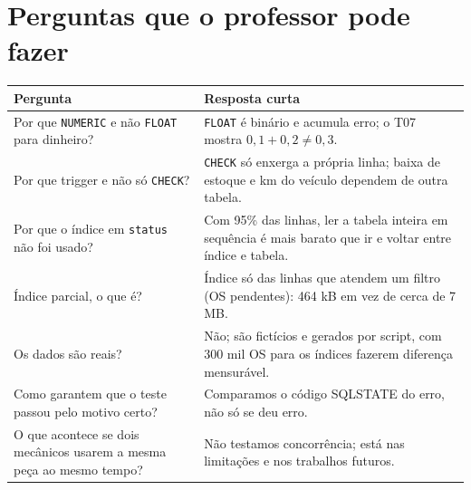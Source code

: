 \documentclass[a4paper,11pt]{article}
\newcommand{\cod}[1]{\texttt{\small #1}}
\begin{document}
\section{Perguntas que o professor pode fazer}
\begin{longtable}{p{6cm}p{9cm}}
\hline
\textbf{Pergunta} & \textbf{Resposta curta} \\ \hline
Por que \cod{NUMERIC} e não \cod{FLOAT} para dinheiro? & \cod{FLOAT} é binário e acumula erro; o T07 mostra $0{,}1+0{,}2 \neq 0{,}3$. \\
Por que trigger e não só \cod{CHECK}? & \cod{CHECK} só enxerga a própria linha; baixa de estoque e km do veículo dependem de outra tabela. \\
Por que o índice em \cod{status} não foi usado? & Com 95\% das linhas, ler a tabela inteira em sequência é mais barato que ir e voltar entre índice e tabela. \\
Índice parcial, o que é? & Índice só das linhas que atendem um filtro (OS pendentes): 464 kB em vez de cerca de 7 MB. \\
Os dados são reais? & Não; são fictícios e gerados por script, com 300 mil OS para os índices fazerem diferença mensurável. \\
Como garantem que o teste passou pelo motivo certo? & Comparamos o código SQLSTATE do erro, não só se deu erro. \\
O que acontece se dois mecânicos usarem a mesma peça ao mesmo tempo? & Não testamos concorrência; está nas limitações e nos trabalhos futuros. \\ \hline
\end{longtable}
\end{document}
